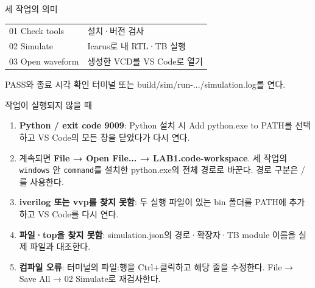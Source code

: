 \begin{frame}{세 작업의 의미}
\small\renewcommand{\arraystretch}{1.5}
\begin{tabular}{@{}p{4.8cm}p{5.3cm}@{}}
01 Check tools&설치·버전 검사\\
02 Simulate&Icarus로 내 RTL·TB 실행\\
03 Open waveform&생성한 VCD를 VS Code로 열기\\
\end{tabular}
\end{frame}

\begin{frame}{PASS와 종료 시각 확인}
\small 터미널 또는 build/sim/run-.../simulation.log를 연다.
\end{frame}

\begin{frame}{작업이 실행되지 않을 때}
\small
\begin{enumerate}\setlength{\itemsep}{0.18cm}
\item \textbf{Python / exit code 9009}: Python 설치 시 Add python.exe to PATH를 선택하고 VS Code의 모든 창을 닫았다가 다시 연다.
\item 계속되면 \textbf{File → Open File... → LAB1.code-workspace}. 세 작업의 \texttt{windows} 안 \texttt{command}를 설치한 python.exe의 전체 경로로 바꾼다. 경로 구분은 /를 사용한다.
\item \textbf{iverilog 또는 vvp를 찾지 못함}: 두 실행 파일이 있는 bin 폴더를 PATH에 추가하고 VS Code를 다시 연다.
\item \textbf{파일·top을 찾지 못함}: simulation.json의 경로·확장자·TB module 이름을 실제 파일과 대조한다.
\item \textbf{컴파일 오류}: 터미널의 파일:행을 Ctrl+클릭하고 해당 줄을 수정한다. File → Save All → 02 Simulate로 재검사한다.
\end{enumerate}
\end{frame}


